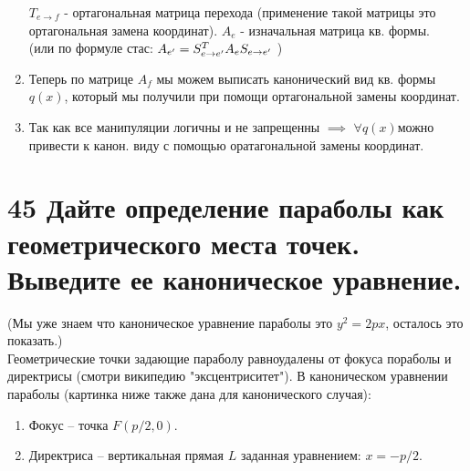 \documentclass[a4paper,12pt,twoside]{article}
\begin{document}
\begin{enumerate}
$ T_{e \rightarrow f} $ - ортагональная матрица перехода (применение такой матрицы это ортагональная замена координат). 
$ A_{e} $ - изначальная матрица кв. формы. \\
(или по формуле стас: $A_{e'} = S_{e \rightarrow e'}^{{\small T}} A_{e} S_{e \rightarrow e'} $ )
\item Теперь по матрице $A_{f}$ мы можем выписать канонический вид кв. формы $q(x)$, который мы получили при помощи ортагональной замены координат.
\item Так как все манипуляции логичны и не запрещенны $ \implies $ $ \forall q(x) $можно привести к канон. виду с помощью оратагональной замены координат.
\end{enumerate}


\section{45 Дайте определение параболы как геометрического места точек. Выведите  ее каноническое уравнение.}
(Мы уже знаем что каноническое уравнение параболы это $y^2 = 2px$, осталось это показать.)  \\
Геометрические точки задающие параболу равноудалены от фокуса пораболы и 
директрисы (смотри википедию "эксцентриситет").
В каноническом уравнении параболы (картинка ниже также дана для канонического случая):
\begin{enumerate}
\item[] Фокус  – точка $ F(p/2, 0) $. 
\item[] Директриса – вертикальная прямая $L$ заданная 
уравнением: $ x = -p/2 $.
\end{enumerate}

\begin{center}
\end{center}
\end{document}
